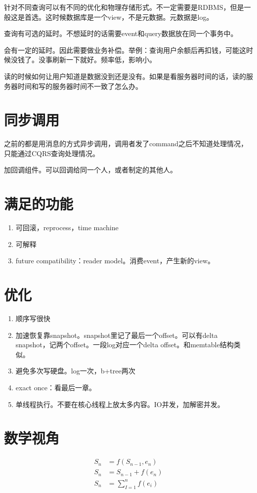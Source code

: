 针对不同查询可以有不同的优化和物理存储形式。不一定需要是RDBMS，但是一般这是首选。这时候数据库是一个view，不是元数据。元数据是log。


查询有可选的延时。不想延时的话需要event和query数据放在同一个事务中。

会有一定的延时。因此需要做业务补偿。举例：查询用户余额后再扣钱，可能这时候没钱了。没事刷新一下就好。频率低，影响小。

读的时候如何让用户知道是数据没到还是没有。如果是看服务器时间的话，读的服务器时间和写的服务器时间不一致了怎么办。


\section{同步调用}

之前的都是用消息的方式异步调用，调用者发了command之后不知道处理情况，只能通过CQRS查询处理情况。

加回调组件。可以回调给同一个人，或者制定的其他人。

\section{满足的功能}
\begin{enumerate}
    \item 可回滚，reprocess，time machine
    \item 可解释
    \item future compatibility：reader model。消费event，产生新的view。
\end{enumerate}



\section{优化}
\begin{enumerate}
    \item 顺序写很快
    \item 加速恢复靠snapshot。snapshot里记了最后一个offset。可以有delta snapshot，记两个offset。一段log对应一个delta offset。和memtable结构类似。
    \item 避免多次写硬盘。log一次，b+tree两次
    \item exact once：看最后一章。
    \item 单线程执行。不要在核心线程上放太多内容。IO并发，加解密并发。
\end{enumerate}

\section{数学视角}
\begin{equation}
\begin{aligned}
      S_n &= f(S_{n-1}, e_n) \\
    S_n &= S_{n-1} + f(e_n)  \\
    S_n &= \sum_{I=1}^n f(e_i)  
\end{aligned}
\end{equation}


